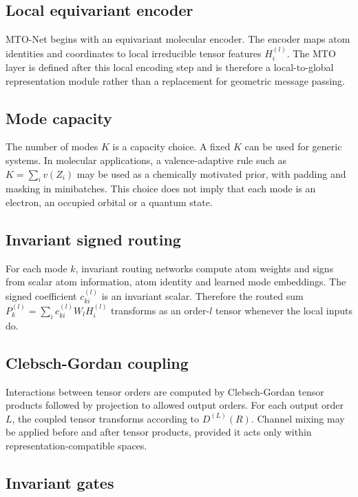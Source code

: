 \documentclass[11pt]{article}
\begin{document}
\subsection*{Local equivariant encoder}

MTO-Net begins with an equivariant molecular encoder. The encoder maps atom identities and coordinates to local irreducible tensor features $H_i^{(l)}$. The MTO layer is defined after this local encoding step and is therefore a local-to-global representation module rather than a replacement for geometric message passing.

\subsection*{Mode capacity}

The number of modes $K$ is a capacity choice. A fixed $K$ can be used for generic systems. In molecular applications, a valence-adaptive rule such as $K=\sum_i v(Z_i)$ may be used as a chemically motivated prior, with padding and masking in minibatches. This choice does not imply that each mode is an electron, an occupied orbital or a quantum state.

\subsection*{Invariant signed routing}

For each mode $k$, invariant routing networks compute atom weights and signs from scalar atom information, atom identity and learned mode embeddings. The signed coefficient $c_{ki}^{(l)}$ is an invariant scalar. Therefore the routed sum $P_k^{(l)}=\sum_i c_{ki}^{(l)}W_lH_i^{(l)}$ transforms as an order-$l$ tensor whenever the local inputs do.

\subsection*{Clebsch-Gordan coupling}

Interactions between tensor orders are computed by Clebsch-Gordan tensor products followed by projection to allowed output orders. For each output order $L$, the coupled tensor transforms according to $D^{(L)}(R)$. Channel mixing may be applied before and after tensor products, provided it acts only within representation-compatible spaces.

\subsection*{Invariant gates}
\end{document}
